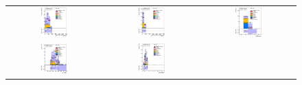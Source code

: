 \clearpage
\begin{figure}[htbp]
\begin{center}
\begin{tabular}{ccc}
%
\includegraphics[width=0.30\textwidth]{appendices/figures/sdrs/JetPtB1_ELEMUONCR8_1W_NOMINAL.eps}  &
\includegraphics[width=0.30\textwidth]{appendices/figures/sdrs/JetPtB2_ELEMUONCR8_1W_NOMINAL.eps} &
\includegraphics[width=0.30\textwidth]{appendices/figures/sdrs/nWhad_ELEMUONCR8_1W_NOMINAL_logscale.eps} \\
\includegraphics[width=0.30\textwidth]{appendices/figures/sdrs/VLQAna_WbX_W1Pt_ELEMUONCR8_1W_NOMINAL.eps} &
\includegraphics[width=0.30\textwidth]{appendices/figures/sdrs/VLQAna_WbX_DRLepMet_ELEMUONCR8_1W_NOMINAL.eps} &

\end{tabular}
\end{center}
\end{figure}
